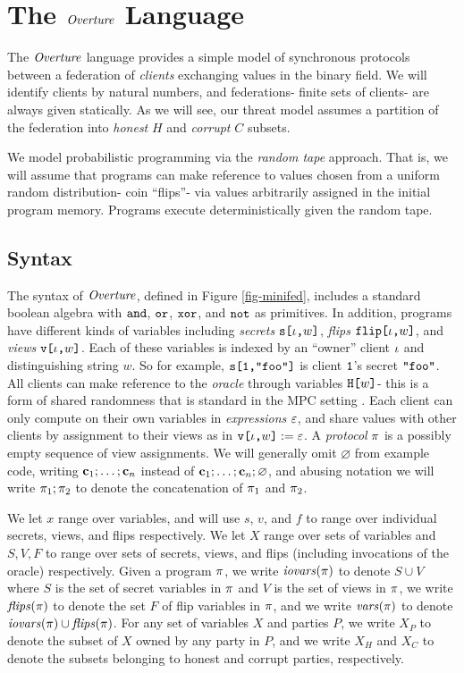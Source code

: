\section{The $\mathit{Overture}$ Language}
\label{section-minicat}

The $\mathit{Overture}$ language provides a simple model of synchronous
protocols between a federation of \emph{clients} exchanging values in
the binary field. We will identify clients by natural numbers, and
federations- finite sets of clients- are always given statically.
As we will see, our threat model assumes a partition of the federation
into \emph{honest} $H$ and \emph{corrupt} $C$ subsets.

We model probabilistic programming via the \emph{random tape}
approach. That is, we will assume that programs can make reference to
values chosen from a uniform random distribution- coin ``flips''- via
values arbitrarily assigned in the initial program memory.  Programs
execute deterministically given the random tape. 

\subsection{Syntax} The syntax of $\mathit{Overture}$, defined in
Figure \ref{fig-minifed}, includes a standard boolean algebra
with $\texttt{and}$, $\texttt{or}$, $\texttt{xor}$, and $\texttt{not}$ as primitives. In addition,
programs have different kinds of variables including \emph{secrets}
$\texttt{s[}\iota\texttt{,}w\texttt{]}$, \emph{flips} $\texttt{flip[}\iota\texttt{,}w\texttt{]}$, and \emph{views}
$\texttt{v[}\iota\texttt{,}w\texttt{]}$.  Each of these variables is indexed by an ``owner''
client $\iota$ and distinguishing string $w$. So for example,
$\texttt{s[}\texttt{1}\texttt{,}\texttt{"foo"}\texttt{]}$ is client $\texttt{1}$'s secret 
$\texttt{"foo"}$. All clients can make reference to the \emph{oracle}
through variables $\texttt{H[}w\texttt{]}$- this is a form of shared randomness
that is standard in the MPC setting \cite{evans2018pragmatic}.  Each client can only
compute on their own variables in \emph{expressions} $\varepsilon$, and share
values with other clients by assignment to their views as in
$\texttt{v[}\iota\texttt{,}w\texttt{]} := \varepsilon$.  A \emph{protocol} $\pi$ is a
possibly empty sequence of view assignments. We will generally omit
$\varnothing$ from example code, writing $\mathbf{c}_1;\ldots;\mathbf{c}_n$
instead of $\mathbf{c}_1;\ldots;\mathbf{c}_n;\varnothing$, and abusing notation we will
write $\pi_1;\pi_2$ to denote the concatenation of $\pi_1$
and $\pi_2$.

We let $x$ range over variables, and will use $s$, $v$, and $f$ to
range over individual secrets, views, and flips respectively. We let
$X$ range over sets of variables and $S,V,F$ to range over sets of
secrets, views, and flips (including invocations of the oracle)
respectively. Given a program $\pi$, we write $\mathit{iovars}(\pi)$ to
denote $S \cup V$ where $S$ is the set of secret variables in $\pi$
and $V$ is the set of views in $\pi$, we write $\mathit{flips}(\pi)$ to
denote the set $F$ of flip variables in $\pi$, and we write
$\mathit{vars}(\pi)$ to denote $\mathit{iovars}(\pi) \cup \mathit{flips}(\pi)$. For any set
of variables $X$ and parties $P$, we write $X_P$ to denote the subset
of $X$ owned by any party in $P$, and we write $X_H$ and $X_C$ to
denote the subsets belonging to honest and corrupt parties,
respectively.

